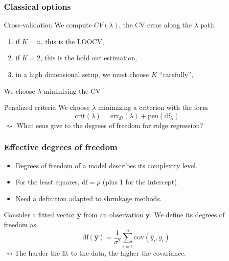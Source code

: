 \documentclass{beamer}\usepackage[]{graphicx}\usepackage[]{color}
\begin{document}
\begin{frame}
   \frametitle{Classical options}

 \begin{block}{Cross-validation}
   We compute $CV(\lambda)$, the CV error along the $\lambda$ path
    \begin{enumerate}
    \item if $K=n$, this is the LOOCV,
    \item if $K=2$, this is the hold out estimation,
    \item in a high dimensional setup, we must choose $K$ ``carefully'',
    \end{enumerate}
   We choose  $\lambda$ minimising the CV 
  \end{block}

\vfill

\begin{block}{Penalized criteria}
We choose  $\lambda$ minimizing a criterion with the form
\begin{equation*}
\mathrm{crit}(\lambda) = \mathrm{err}_\mathcal{D}(\lambda) + \mathrm{pen}(\mathrm{df}_\lambda)
\end{equation*}
$\rightsquigarrow$ What sens give to the degrees of freedom for ridge regression?
\end {block}

\end{frame}


\begin{frame}
  \frametitle{Effective degrees of freedom}

  \begin{itemize}
  \item Degrees of freedom of a model describes its complexity level.
  \item For the least squares, $\mathrm{df} = p$ (plus 1 for the intercept).
  \item Need a definition adapted to shrinkage methods.
  \end{itemize}

  \vfill

  \begin{definition}   Consider  a  fitted  vector
    $\hat{\mathbf{y}}$ from an observation $\mathbf{y}$. We define its
    degrees of freedom as
    \begin{equation*}
      \mathrm{df}(\hat{\mathbf{y}})    =    \frac{1}{\sigma^2}
      \sum_{i=1}^n \mathrm{cov}(\hat{y}_i,y_i).
    \end{equation*}
    $\rightsquigarrow$The  harder the fit  to the  data, the  higher the
    covariance.
  \end{definition}

\end{frame}
\end{document}
